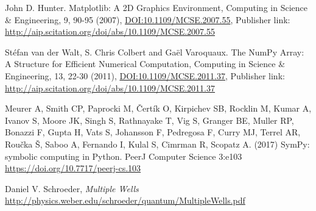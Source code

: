 \documentclass[../main.tex]{subfiles}
\begin{document}
\begin{thebibliography}{99}
 John D. Hunter. Matplotlib: A 2D Graphics Environment, Computing in Science \& Engineering, 9, 90-95 (2007), \href{http://dx.doi.org/10.1109/MCSE.2007.55}{DOI:10.1109/MCSE.2007.55}, Publisher link:  \url{http://aip.scitation.org/doi/abs/10.1109/MCSE.2007.55}

 Stéfan van der Walt, S. Chris Colbert and Gaël Varoquaux. The NumPy Array: A Structure for Efficient Numerical Computation, Computing in Science \& Engineering, 13, 22-30 (2011), \href{http://dx.doi.org/10.1109/MCSE.2011.37}{DOI:10.1109/MCSE.2011.37}, Publisher link:  \url{http://aip.scitation.org/doi/abs/10.1109/MCSE.2011.37}

 Meurer A, Smith CP, Paprocki M, Čertík O, Kirpichev SB, Rocklin M, Kumar A, Ivanov S, Moore JK, Singh S, Rathnayake T, Vig S, Granger BE, Muller RP, Bonazzi F, Gupta H, Vats S, Johansson F, Pedregosa F, Curry MJ, Terrel AR, Roučka Š, Saboo A, Fernando I, Kulal S, Cimrman R, Scopatz A. (2017) SymPy: symbolic computing in Python. PeerJ Computer Science 3:e103 \url{https://doi.org/10.7717/peerj-cs.103}

 Daniel V. Schroeder, \emph{Multiple Wells} \url{http://physics.weber.edu/schroeder/quantum/MultipleWells.pdf}



\end{thebibliography}
\end{document}
